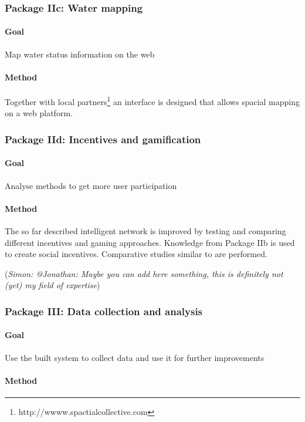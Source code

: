 \documentclass[11pt]{article}
\newcommand{\simon}[1]{\vspace{1em}(\emph{Simon: #1})\vspace{1em}}
\begin{document}
\subsubsection*{Package IIc: Water mapping}
\paragraph{Goal} Map water status information on the web
\paragraph{Method} Together with local partners\footnote{http://wwww.spactialcollective.com} an interface is designed that allows spacial mapping on a web platform.

\subsubsection*{Package IId: Incentives and gamification}
\paragraph{Goal} Analyse methods to get more user participation
\paragraph{Method}
The so far described intelligent network is improved by testing and comparing different incentives and gaming approaches. Knowledge from Package IIb is used to create social incentives. Comparative studies similar to \cite{blaschkeextrinsic} are performed. 

\simon{@Jonathan: Maybe you can add here something, this is definitely not (yet) my field of expertise}

\subsubsection*{Package III: Data collection and analysis}
\paragraph{Goal} Use the built system to collect data and use it for further improvements
\paragraph{Method}
\end{document}
